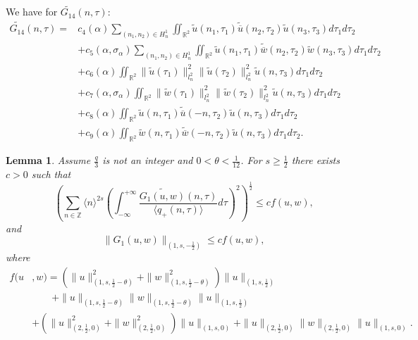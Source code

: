\documentclass[reqno]{amsart}
\newtheorem{lemma}{Lemma}[section]
\numberwithin{equation}{section}
\begin{document}
We have for $\widetilde{G_{14}}(n,\tau)$:
\begin{equation}
\begin{split}
\widetilde{G_{14}}(n,\tau)  =& c_{4}(\alpha)\sum\limits_{(n_{1},n_{2})\in
H_{n}^{1}}\iint\nolimits_{\mathbb{R}^{2}}\widetilde{u}(n_{1},\tau
_{1})\widetilde{\overline{u}}(n_{2},\tau_{2})\widetilde{u}(n_3,\tau_3)d\tau_{1}d\tau_{2}\\
&  +c_{5}(\alpha,\sigma_{\alpha})\sum\limits_{(n_{1},n_{2})\in H_{n}^{1}}\iint\nolimits_{\mathbb{R}^{2}}\widetilde{u}(n_{1},\tau_{1})\widetilde
{\overline{w}}(n_{2},\tau_{2})\widetilde{w}(n_3,\tau_3)d\tau_{1}d\tau_{2}\\
&  +c_{6}(\alpha)\iint\nolimits_{\mathbb{R}^{2}}\| \widetilde{u}(\tau_{1})\| _{l_{n}^{2}}^{2}\|
\widetilde{u}(\tau
_{2})\| _{l_{n}^{2}}^{2}\widetilde{u}(n,\tau_3)d\tau_{1}d\tau_{2}\\
& +c_{7}(\alpha,\sigma_{\alpha})\iint\nolimits_{\mathbb{R}^{2}}\|
\widetilde{w}(\tau_{1})\| _{l_{n}^{2}}^{2}\|
\widetilde
{w}(\tau_{2})\| _{l_{n}^{2}}^{2}\widetilde{u}(n,\tau_3)d\tau_{1}d\tau_{2}\\
& +c_{8}(\alpha)\iint\nolimits_{\mathbb{R}^{2}}\widetilde{u}(n,\tau
_{1})\widetilde{\overline{u}}(-n,\tau_{2})\widetilde{u}(n,\tau_3)d\tau_{1}d\tau_{2}\\
& +c_{9}(\alpha)\iint\nolimits_{\mathbb{R}^{2}}\widetilde{w}(n,\tau
_{1})\widetilde{\overline{w}}(-n,\tau_{2})\widetilde{u}(n,\tau_3)d\tau_{1}d\tau_{2}.
\end{split}
\end{equation}

\begin{lemma}
Assume $\frac{q}{3}$ is not an integer and
$0<\theta<\frac{1}{12}$. For $s\geq\frac{1}{2}$ there exists $c>0$
such that
\begin{equation}\label{4.27}
\left(  \sum\limits_{n\in\mathbb{Z}}\langle n\rangle^{2s}\left(
\int
_{-\infty}^{+\infty}\frac{\widetilde{G_{1}(u,w)}(n,\tau)}{\langle q_{+}(n,\tau)\rangle}d\tau\right)  ^{2}\right)  ^{\frac{1}{2}}\leq
cf(u,w)\text{,}
\end{equation}
and
\begin{equation}\label{4.28}
\| G_{1}(u,w)\| _{(1,s,-\frac12)}\leq cf(u,w)\text{,}
\end{equation}
where
\begin{equation}\label{4.29}
\begin{split}
f(u&,w)=( \| u\| _{(1,s,\frac12 -\theta)}^{2}+\| w\| _{(1,s,\frac12-\theta)}^2)
 \| u\| _{(1,s,\frac12)}\\
&\qquad+\| u\| _{(1,s,\frac12-\theta)}\| w\| _{(1,s,\frac12-\theta)}\| u\| _{(1,s,\frac12)}\\
&+\left(  \| u\| _{(2,\frac12,0)}^{2}+\| w\| _{(2,\frac12,0)}^{2}\right)  \| u\| _{(1,s,0)}
+\|u\|_{(2,\frac12,0)}\| w\| _{(2,\frac12,0)}\| u\| _{(1,s,0)}.
\end{split}
\end{equation}
\end{lemma}
\end{document}
